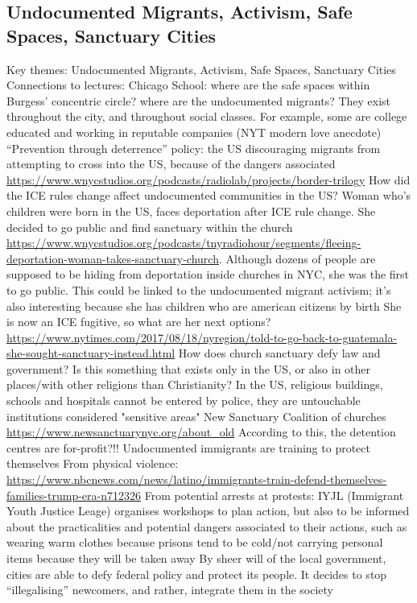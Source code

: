 \documentclass{article}
\begin{document}
\subsection{Undocumented Migrants, Activism, Safe Spaces, Sanctuary Cities}

\begin{outline}
	\1 Key themes: Undocumented Migrants, Activism, Safe Spaces, Sanctuary Cities
	\1 Connections to lectures:
		\2 Chicago School: where are the safe spaces within Burgess' concentric circle? where are the undocumented migrants? They exist throughout the city, and throughout social classes. For example, some are college educated and working in reputable companies (NYT modern love anecdote)
	\1 ``Prevention through deterrence'' policy: the US discouraging migrants from attempting to cross into the US, because of the dangers associated \url{https://www.wnycstudios.org/podcasts/radiolab/projects/border-trilogy}
		\2 How did the ICE rules change affect undocumented communities in the US?
		\2 Woman who's children were born in the US, faces deportation after ICE rule change. She decided to go public and find sanctuary within the church \url{https://www.wnycstudios.org/podcasts/tnyradiohour/segments/fleeing-deportation-woman-takes-sanctuary-church}. Although dozens of people are supposed to be hiding from deportation inside churches in NYC, she was the first to go public. This could be linked to the undocumented migrant activism; it's also interesting because she has children who are american citizens by birth
			\3 She is now an ICE fugitive, so what are her next options? \url{https://www.nytimes.com/2017/08/18/nyregion/told-to-go-back-to-guatemala-she-sought-sanctuary-instead.html}  
		\2 How does church sanctuary defy law and government? Is this something that exists only in the US, or also in other places/with other religions than Christianity?
			\3 In the US, religious buildings, schools and hospitals cannot be entered by police, they are untouchable institutions considered "sensitive areas"
			\3 New Sanctuary Coalition of churches \url{https://www.newsanctuarynyc.org/about_old} According to this, the detention centres are for-profit?!!
	\1 Undocumented immigrants are training to protect themselves
		\2 From physical violence: \url{https://www.nbcnews.com/news/latino/immigrants-train-defend-themselves-families-trump-era-n712326}
		\2 From potential arrests at protests: IYJL (Immigrant Youth Justice Leage) organises workshops to plan action, but also to be informed about the practicalities and potential dangers associated to their actions, such as wearing warm clothes because prisons tend to be cold/not carrying personal items because they will be taken away \cite{swerts2017creating}
	\1 By sheer will of the local government, cities are able to defy federal policy and protect its people. It decides to stop ``illegalising''\cite{swerts2021undocumented} newcomers, and rather, integrate them in the society
		
\end{outline}
\end{document}
